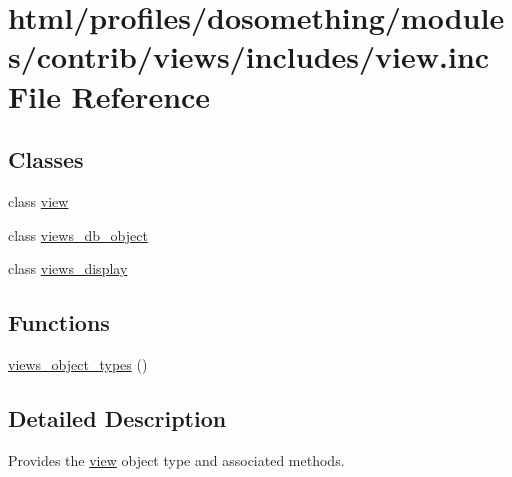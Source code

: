 \hypertarget{views_2includes_2view_8inc}{
\section{html/profiles/dosomething/modules/contrib/views/includes/view.inc File Reference}
\label{views_2includes_2view_8inc}
}
\subsection*{Classes}
\begin{DoxyCompactItemize}
\item 
class \hyperlink{classview}{view}
\item 
class \hyperlink{classviews__db__object}{views\_\-db\_\-object}
\item 
class \hyperlink{classviews__display}{views\_\-display}
\end{DoxyCompactItemize}
\subsection*{Functions}
\begin{DoxyCompactItemize}
\item 
\hyperlink{group__views__objects_gad8249e4064daa263cdadc049caff2c95}{views\_\-object\_\-types} ()
\end{DoxyCompactItemize}


\subsection{Detailed Description}
Provides the \hyperlink{classview}{view} object type and associated methods. 